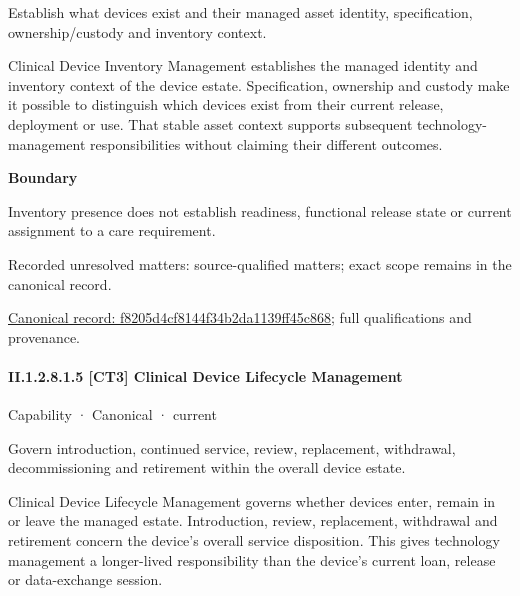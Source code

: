 Establish what devices exist and their managed asset identity, specification, ownership/custody and inventory context.



Clinical Device Inventory Management establishes the managed identity and inventory context of the device estate. Specification, ownership and custody make it possible to distinguish which devices exist from their current release, deployment or use. That stable asset context supports subsequent technology-management responsibilities without claiming their different outcomes.



\textbf{Boundary}



Inventory presence does not establish readiness, functional release state or current assignment to a care requirement.


{\small Recorded unresolved matters: source-qualified matters; exact scope remains in the canonical record.}\par
{\footnotesize \href{../../../../continuum/strategy/capability/f8205d4cf8144f34b2da1139ff45c868.md}{Canonical record: f8205d4cf8144f34b2da1139ff45c868}; full qualifications and provenance.}\par
\paragraph*{II.1.2.8.1.5 [CT3] Clinical Device Lifecycle Management}
\label{navigation:II.1.2.8.1.5}

\label{element:186667f5a3844d10a236af73bc91a0de}
{\small Capability · Canonical · current}\par

Govern introduction, continued service, review, replacement, withdrawal, decommissioning and retirement within the overall device estate.



Clinical Device Lifecycle Management governs whether devices enter, remain in or leave the managed estate. Introduction, review, replacement, withdrawal and retirement concern the device's overall service disposition. This gives technology management a longer-lived responsibility than the device's current loan, release or data-exchange session.



